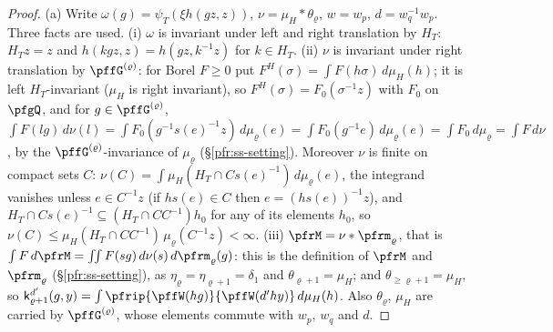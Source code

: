 \documentclass[10pt]{amsart}
\theoremstyle{definition}
\theoremstyle{remark}
\begin{document}
\begin{proof}
(a) Write $\omega(g)=\psi_T(\xi h(gz,z))$, $\nu=\mu_H\ast\theta_\varrho$, $w=w_p$, $d=w_q^{-1}w_p$. Three facts are used.
(i) $\omega$ is invariant under left and right translation by $H_T$: $H_Tz=z$ and $h(kgz,z)=h(gz,k^{-1}z)$ for $k\in H_T$.
(ii) $\nu$ is invariant under right translation by $\pffG^{(\varrho)}$: for Borel $F\ge0$ put $F^H(\sigma)=\int F(h\sigma)\,
d\mu_H(h)$; it is left $H_T$-invariant ($\mu_H$ is right invariant), so $F^H(\sigma)=F_0(\sigma^{-1}z)$ with $F_0$ on $\pfgQ$, and
for $g\in\pffG^{(\varrho)}$, $\int F(lg)\,d\nu(l)=\int F_0(g^{-1}s(e)^{-1}z)\,d\mu_\varrho(e)=\int F_0(g^{-1}e)\,d\mu_\varrho(e)=\int F_0\,d\mu_\varrho
=\int F\,d\nu$, by the $\pffG^{(\varrho)}$-invariance of $\mu_\varrho$ (\S\ref{pfr:ss-setting}). Moreover $\nu$ is finite on compact
sets $C$: $\nu(C)=\int\mu_H(H_T\cap Cs(e)^{-1})\,d\mu_\varrho(e)$, the integrand vanishes unless $e\in C^{-1}z$ (if $hs(e)\in C$ then
$e=(hs(e))^{-1}z$), and $H_T\cap Cs(e)^{-1}\subseteq(H_T\cap CC^{-1})h_0$ for any of its elements $h_0$, so
$\nu(C)\le\mu_H(H_T\cap CC^{-1})\,\mu_\varrho(C^{-1}z)<\infty$.
(iii) $\pfrM=\nu\ast\pfrm_\varrho$, that is $\int F\,d\pfrM=\iint F(sg)\,d\nu(s)\,d\pfrm_\varrho(g)$: this is the definition of
$\pfrM$ and $\pfrm_\varrho$ (\S\ref{pfr:ss-setting}), as $\eta_\varrho=\eta_{\varrho+1}=\delta_1$ and $\theta_{\varrho+1}=\mu_H$; and
$\theta_{\ge\varrho+1}=\mu_H$, so $\mathsf k^{d'}_{\varrho+1}(g,y)=\int\pfrip{\pffW(hg)}{\pffW(d'hy)}\,d\mu_H(h)$.
Also $\theta_\varrho$, $\mu_H$ are carried by $\pffG^{(\varrho)}$, whose elements commute with $w_p$, $w_q$ and $d$.


\end{proof}
\end{document}
